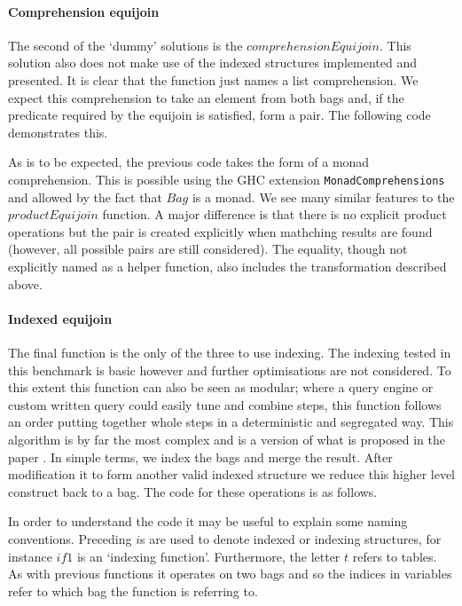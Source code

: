\paragraph{Comprehension equijoin} The second of the `dummy' solutions is the
$comprehensionEquijoin$.
This solution also does not make use of the indexed structures implemented and
presented. It is
clear that the function just names a list comprehension. We expect this
comprehension to take an element from both bags and, if the predicate required
by the equijoin is satisfied, form a pair. The following code demonstrates
this.



\noindent
As is to be expected, the previous code takes the form of a monad comprehension.
This is possible using the GHC extension \verb|MonadComprehensions| and allowed by
the fact that $Bag$ is a monad. We see many similar
features to the $productEquijoin$ function. A major difference is that there is
no explicit product operations but the pair is created explicitly when mathching
results are found (however, all possible pairs are still considered). The equality, though
not explicitly named as a helper function, also includes the transformation described above.

\paragraph{Indexed equijoin} The final function is the only of the three to use
indexing. The indexing tested in this benchmark is basic however and further
optimisations are not considered. To this extent this function can also be seen as
modular; where a query engine or
custom written query could easily tune and combine steps, this function follows an
order putting together whole steps in a deterministic and segregated way.
This algorithm is by far
the most complex and is a version of what is proposed in the paper \relalg{}. In
simple terms, we index the bags and merge the result. After modification it to form
another valid indexed
structure we reduce this higher level construct back to a bag. The code for
these operations is as follows.



\noindent
In order to understand the code it may be useful to explain some naming
conventions. Preceding $i$s are used to denote indexed or indexing structures,
for instance $if1$ is an `indexing function'. Furthermore, the letter $t$
refers to tables. As with previous functions it operates on two bags and
so the indices in variables refer to which bag the function is referring to.

